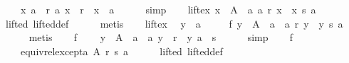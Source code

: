 \begin{isabellebody}
\ \ \ \ {\isachardoublequoteopen}{\isasymlbrakk}{\isacharparenleft}{\kern0pt}x{\isacharcomma}{\kern0pt}\ a{\isacharparenright}{\kern0pt}\ {\isasymin}\ r{\isacharsemicolon}{\kern0pt}\ {\isacharparenleft}{\kern0pt}a{\isacharcomma}{\kern0pt}\ x{\isacharparenright}{\kern0pt}\ {\isasymin}\ r{\isasymrbrakk}\ {\isasymLongrightarrow}\ x\ {\isacharequal}{\kern0pt}\ a{\isachardoublequoteclose}\isanewline
\ \ \ \ \isamarkupfalse%
\ simp\isanewline
\ \ \isamarkupfalse%
\ lift{\isacharunderscore}{\kern0pt}ex{\isacharcolon}{\kern0pt}\ {\isachardoublequoteopen}{\isasymexists}x\ {\isasymin}\ A\ {\isacharminus}{\kern0pt}\ {\isacharbraceleft}{\kern0pt}a{\isacharbraceright}{\kern0pt}{\isachardot}{\kern0pt}\ a\ {\isasympreceq}\isactrlsub r\ x\ {\isasymand}\ x\ {\isasympreceq}\isactrlsub s\ a{\isachardoublequoteclose}\isanewline
\ \ \ \ \isamarkupfalse%
\ lifted\ lifted{\isacharunderscore}{\kern0pt}def\isanewline
\ \ \ \ \isamarkupfalse%
\ metis\isanewline
\ \ \isamarkupfalse%
\ lift{\isacharunderscore}{\kern0pt}ex\ \isamarkupfalse%
\ y\ {\isacharcolon}{\kern0pt}{\isacharcolon}{\kern0pt}\ {\isacharprime}{\kern0pt}a\ \isanewline
\ \ \ \ f{}{\isacharcolon}{\kern0pt}\ {\isachardoublequoteopen}y\ {\isasymin}\ A\ {\isacharminus}{\kern0pt}\ {\isacharbraceleft}{\kern0pt}a{\isacharbraceright}{\kern0pt}\ {\isasymand}\ a\ {\isasympreceq}\isactrlsub r\ y\ {\isasymand}\ y\ {\isasympreceq}\isactrlsub s\ a{\isachardoublequoteclose}\isanewline
\ \ \ \ \isamarkupfalse%
\ metis\isanewline
\ \ \isamarkupfalse%
\ f{}{\isacharunderscore}{\kern0pt}{}{\isacharcolon}{\kern0pt}\isanewline
\ \ \ \ {\isachardoublequoteopen}y\ {\isasymin}\ A\ {\isacharminus}{\kern0pt}\ {\isacharbraceleft}{\kern0pt}a{\isacharbraceright}{\kern0pt}\ {\isasymand}\ {\isacharparenleft}{\kern0pt}a{\isacharcomma}{\kern0pt}\ y{\isacharparenright}{\kern0pt}\ {\isasymin}\ r\ {\isasymand}\ {\isacharparenleft}{\kern0pt}y{\isacharcomma}{\kern0pt}\ a{\isacharparenright}{\kern0pt}\ {\isasymin}\ s{\isachardoublequoteclose}\isanewline
\ \ \ \ \isamarkupfalse%
\ simp\isanewline
\ \ \isamarkupfalse%
\ f{}{\isacharcolon}{\kern0pt}\isanewline
\ \ \ \ {\isachardoublequoteopen}equiv{\isacharunderscore}{\kern0pt}rel{\isacharunderscore}{\kern0pt}except{\isacharunderscore}{\kern0pt}a\ A\ r\ s\ a{\isachardoublequoteclose}\isanewline
\ \ \ \ \isamarkupfalse%
\ lifted\ lifted{\isacharunderscore}{\kern0pt}def\isanewline

\end{isabellebody}
